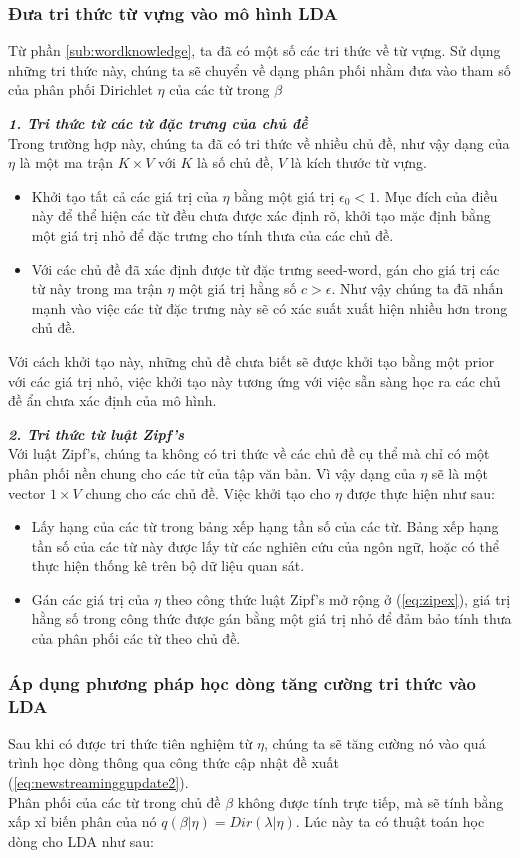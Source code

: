 \documentclass[fontsize=13pt]{scrartcl}
\begin{document}
\subsubsection{Đưa tri thức từ vựng vào mô hình LDA}
Từ phần \ref{sub:wordknowledge}, ta đã có một số các tri thức về từ vựng. Sử dụng những tri thức này, chúng ta sẽ chuyển về dạng phân phối nhằm đưa vào tham số của phân phối Dirichlet $\eta$ của các từ trong $\beta$
\par 
\textbf{\textit{1. Tri thức từ các từ đặc trưng của chủ đề}}\\
Trong trường hợp này, chúng ta đã có tri thức về nhiều chủ đề, như vậy dạng của $\eta$ là một ma trận $K \times V $ với $K$ là số chủ đề, $V$ là kích thước từ vựng.
\begin{itemize}
\item Khởi tạo tất cả các giá trị của $\eta$ bằng một giá trị $\epsilon_0 < 1$. Mục đích của điều này để thể hiện các từ đều chưa được xác định rõ, khởi tạo mặc định bằng một giá trị nhỏ để đặc trưng cho tính thưa của các chủ đề.
\item Với các chủ đề đã xác định được từ đặc trưng seed-word, gán cho giá trị các từ này trong ma trận $\eta$ một giá trị hằng số $c > \epsilon$. Như vậy chúng ta đã nhấn mạnh vào việc các từ đặc trưng này sẽ có xác suất xuất hiện nhiều hơn trong chủ đề.
\end{itemize}
Với cách khởi tạo này, những chủ đề chưa biết sẽ được khởi tạo bằng một prior với các giá trị nhỏ, việc khởi tạo này tương ứng với việc sẵn sàng học ra các chủ đề ẩn chưa xác định của mô hình.
\par
\textbf{\textit{2. Tri thức từ luật Zipf's}}\\
Với luật Zipf's, chúng ta không có tri thức về các chủ đề cụ thể mà chỉ có một phân phối nền chung cho các từ của tập văn bản. Vì vậy dạng của $\eta$ sẽ là một vector $1\times V$ chung cho các chủ đề.
Việc khởi tạo cho $\eta$ được thực hiện như sau:
\begin{itemize}
\item Lấy hạng của các từ trong bảng xếp hạng tần số của các từ. Bảng xếp hạng tần số của các từ này được lấy từ các nghiên cứu của ngôn ngữ, hoặc có thể thực hiện thống kê trên bộ dữ liệu quan sát.
\item Gán các giá trị của $\eta$ theo công thức luật Zipf's mở rộng ở (\ref{eq:zipex}), giá trị hằng số trong công thức được gán bằng một giá trị nhỏ để đảm bảo tính thưa của phân phối các từ theo chủ đề. 
\end{itemize}
\subsubsection{Áp dụng phương pháp học dòng tăng cường tri thức vào LDA}
\label{sec:PartIII}
Sau khi có được tri thức tiên nghiệm từ $\eta$, chúng ta sẽ tăng cường nó vào quá trình học dòng thông qua công thức cập nhật đề xuất (\ref{eq:newstreaminggupdate2}).\\
Phân phối của các từ trong chủ đề $\beta$ không được tính trực tiếp, mà sẽ tính bằng xấp xỉ biến phân của nó $q(\beta | \eta) = Dir(\lambda | \eta)$.
Lúc này ta có thuật toán học dòng cho LDA như sau: 
\end{document}
